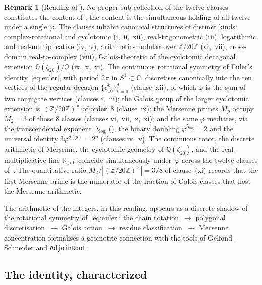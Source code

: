 \documentclass[11pt]{amsart}
\theoremstyle{definition}
\newtheorem{Remark}[Theorem]{Remark}
\newcommand{\golden}{\varphi}
\newcommand{\Mp}{M_{p}}
\newcommand{\Ztwenty}{(\mathbb{Z}/20\mathbb{Z})^{\times}}
\begin{document}
\begin{Remark}[Reading of ]\label{rem:euler-reading}
No proper sub-collection of the twelve clauses constitutes the content
of ; the content is the simultaneous holding
of all twelve under a single $\golden$.  The clauses inhabit canonical
structures of distinct kinds: complex-rotational and cyclotomic
(i,~ii,~xii), real-trigonometric (iii), logarithmic and
real-multiplicative (iv,~v), arithmetic-modular over $\mathbb{Z}/20\mathbb{Z}$
(vi,~vii), cross-domain real-to-complex (viii), Galois-theoretic of the
cyclotomic decagonal extension $\mathbb{Q}(\zeta_{20})/\mathbb{Q}$
(ix,~x,~xi).  The continuous rotational symmetry of
Euler's identity~\eqref{eq:euler}, with period $2\pi$ in
$S^{1}\subset\mathbb{C}$, discretises canonically into the ten
vertices of the regular decagon
$\{\zeta_{10}^{k}\}_{k=0}^{9}$ (clause~xii), of which $\golden$ is the
sum of two conjugate vertices (clauses i,~iii); the Galois group of
the larger cyclotomic extension is~$\Ztwenty$ of order~$8$
(clause~ix); the Mersenne primes $\Mp$ occupy $M_{2}=3$ of those $8$
classes (clauses vi,~vii,~x,~xi); and the same $\golden$ mediates, via
the transcendental exponent~$\lambda_{\log}$ (),
the binary doubling $\golden^{\lambda_{\log}}=2$ and the universal
identity $3\golden^{\sigma(p)}=2^{p}$ (clauses iv,~v).  The continuous
rotor, the discrete arithmetic of Mersenne, the cyclotomic geometry of
$\mathbb{Q}(\zeta_{20})$, and the real-multiplicative line
$\mathbb{R}_{>0}$ coincide simultaneously under~$\golden$ across the
twelve clauses of~.  The quantitative ratio
$M_{2}/|\Ztwenty|=3/8$ of clause~(xi) records that the first Mersenne
prime is the numerator of the fraction of Galois classes that host
the Mersenne arithmetic.

The arithmetic of the integers, in this reading, appears as a discrete
shadow of the rotational symmetry of~\eqref{eq:euler}: the chain
rotation~$\to$ polygonal discretisation~$\to$ Galois action~$\to$
residue classification~$\to$ Mersenne concentration formalises a
geometric connection with the tools of Gelfond--Schneider and
\texttt{AdjoinRoot}.
\end{Remark}

\subsection{The identity, characterized}
\label{ssec:characterization}
\end{document}
